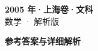 \documentclass[zihao=-4, a4paper]{ctexart}
\begin{document}
\begin{center}
  {\Large\bfseries 2005 年·上海卷·文科}\\[4pt]
  {\large 数学 · 解析版}
\end{center}
\medskip
{}

\clearpage
{}
\begin{center}{\Large\bfseries 参考答案与详细解析}\end{center}
\medskip

\end{document}

